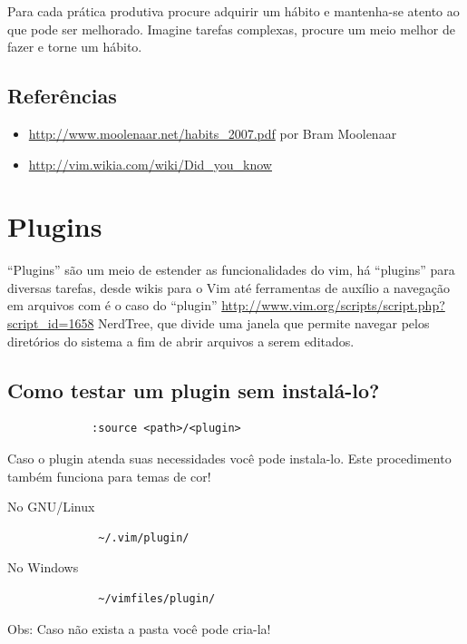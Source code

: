 \documentclass[10pt,a4paper,openany]{book}
\begin{document}
Para cada prática produtiva procure adquirir um hábito e mantenha-se
atento ao que pode ser melhorado. Imagine tarefas complexas, procure
um meio melhor de fazer e torne um hábito.

\section{Referências}
\label{Referências}
\begin{itemize}
	\item \url{http://www.moolenaar.net/habits\_2007.pdf} por Bram Moolenaar
	\item \url{http://vim.wikia.com/wiki/Did\_you\_know}
\end{itemize}


\chapter{Plugins}\label{Plugins}

``Plugins'' são um meio de estender as funcionalidades do vim, há
``plugins'' para diversas tarefas, desde wikis para o Vim até
ferramentas de auxílio a navegação em arquivos com é o caso do
``plugin'' \url{http://www.vim.org/scripts/script.php?script\_id=1658}
NerdTree, que divide uma janela que permite navegar pelos diretórios
do sistema a fim de abrir arquivos a serem editados.

\section{Como testar um plugin sem instalá-lo?}
\label{Como testar um plugin sem instala-lo?}

\begin{verbatim}
			 :source <path>/<plugin>
\end{verbatim}

Caso o plugin atenda suas necessidades você pode instala-lo. Este
procedimento também funciona para temas de cor!



No GNU/Linux
\begin{verbatim}
			  ~/.vim/plugin/
\end{verbatim}

No Windows

\begin{verbatim}
			  ~/vimfiles/plugin/
\end{verbatim}

Obs: Caso não exista a pasta você pode cria-la!
\end{document}
